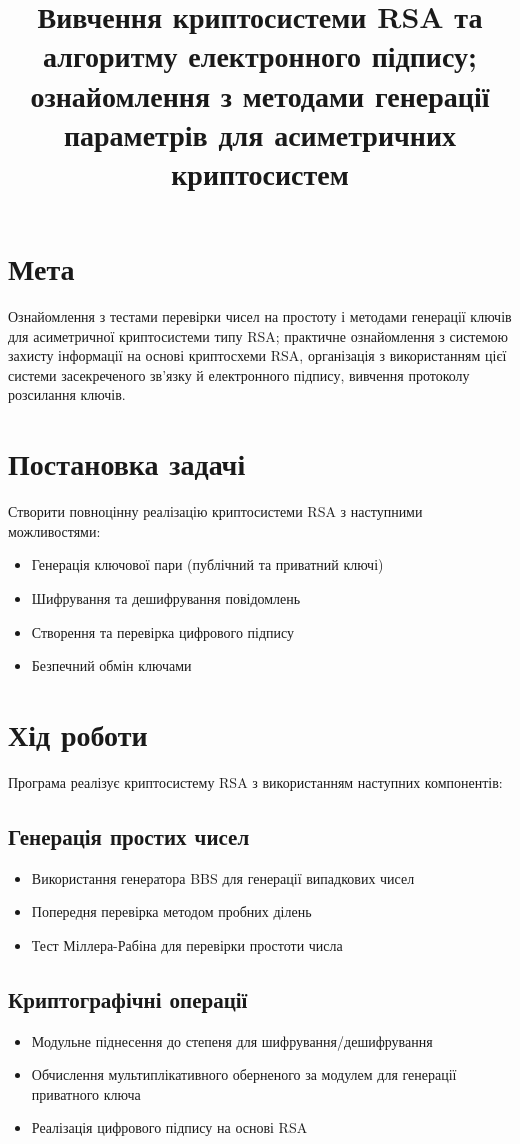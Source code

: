 \documentclass{article}
\title{Вивчення криптосистеми RSA та алгоритму електронного підпису; ознайомлення з методами генерації параметрів для асиметричних криптосистем}
\date{}
\begin{document}
\maketitle

\section{Мета}
\quad Ознайомлення з тестами перевірки чисел на простоту і методами генерації ключів для асиметричної криптосистеми типу RSA; практичне ознайомлення з системою захисту інформації на основі криптосхеми RSA, організація з використанням цієї системи засекреченого зв'язку й електронного підпису, вивчення протоколу розсилання ключів.

\section{Постановка задачі}
\quad Створити повноцінну реалізацію криптосистеми RSA з наступними можливостями:
\begin{itemize}
    \item Генерація ключової пари (публічний та приватний ключі)
    \item Шифрування та дешифрування повідомлень
    \item Створення та перевірка цифрового підпису
    \item Безпечний обмін ключами
\end{itemize}

\section{Хід роботи}
\quad 
Програма реалізує криптосистему RSA з використанням наступних компонентів:

\subsection{Генерація простих чисел}
\begin{itemize}
    \item Використання генератора BBS для генерації випадкових чисел
    \item Попередня перевірка методом пробних ділень
    \item Тест Міллера-Рабіна для перевірки простоти числа
\end{itemize}

\subsection{Криптографічні операції}
\begin{itemize}
    \item Модульне піднесення до степеня для шифрування/дешифрування
    \item Обчислення мультиплікативного оберненого за модулем для генерації приватного ключа
    \item Реалізація цифрового підпису на основі RSA
\end{itemize}
\end{document}
